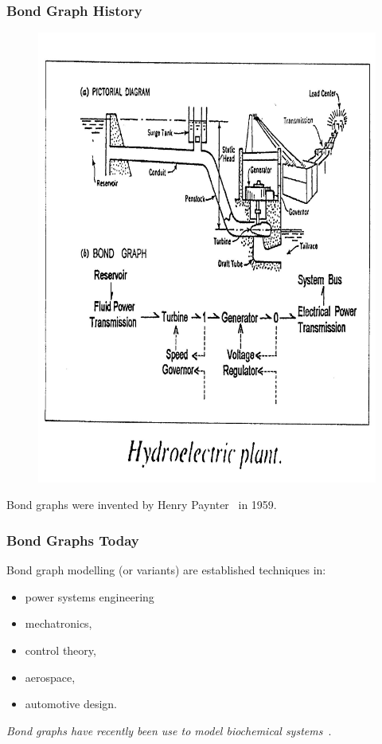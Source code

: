 \documentclass[11pt,reqno]{beamer}
\begin{document}
\begin{frame}
\frametitle{Bond Graph History}
\begin{figure}
\includegraphics[height=0.6\textheight, width=0.7\linewidth]{hydro.jpg}
\end{figure}
Bond graphs were invented by Henry Paynter~\cite{payter2000} in 1959.
\end{frame}
\begin{frame}
\frametitle{Bond Graphs Today}
Bond graph modelling (or variants) are established techniques in:
\begin{itemize}
	\item power systems engineering 
	\item mechatronics,
	\item control theory,
	\item aerospace,
	\item automotive design.
\end{itemize}
\vspace{10pt}
\emph{Bond graphs have recently been use to model biochemical systems}~\cite{Gaw2017a, Gaw2017b, Gaw2014}.
\end{frame}
\end{document}
